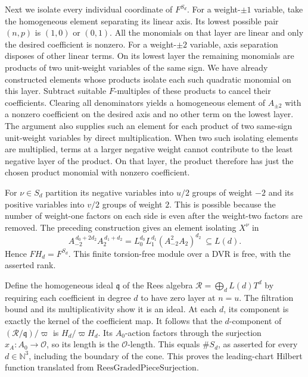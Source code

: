 Next we isolate every individual coordinate of \(F^{S_d}\). For a
weight-\(\pm1\) variable, take the homogeneous element separating
its linear axis. Its lowest possible pair \((n,p)\) is \((1,0)\)
or \((0,1)\). All the monomials on that layer are linear and only
the desired coefficient is nonzero. For a weight-\(\pm2\) variable,
axis separation disposes of other linear terms. On its lowest
layer the remaining monomials are products of two unit-weight
variables of the same sign. We have already constructed elements
whose products isolate each such quadratic monomial on this layer.
Subtract suitable \(F\)-multiples of these products to cancel their
coefficients. Clearing all denominators yields a homogeneous element
of \(A_{\pm2}\) with a nonzero coefficient on the desired axis and
no other term on the lowest layer. The argument also supplies such
an element for each product of two same-sign unit-weight variables
by direct multiplication. When two such isolating elements are
multiplied, terms at a larger negative weight cannot contribute to
the least negative layer of the product. On that layer, the product
therefore has just the chosen product monomial with nonzero coefficient.

For \(\nu\in S_d\) partition its negative variables into
\(u/2\) groups of weight \(-2\) and its positive variables into
\(v/2\) groups of weight \(2\). This is possible because the
number of weight-one factors on each side is even after the
weight-two factors are removed. The preceding construction gives
an element isolating \(X^\nu\) in
\[
 A_{-2}^{\,d_0+2d_2}A_2^{\,d_1+d_2}
    = L_0^{d_0}L_1^{d_1}(A_{-2}^2A_2)^{d_2}
    \ \subseteq L(d).
\]
Hence \(F H_d=F^{S_d}\). This finite torsion-free module over a DVR
is free, with the asserted rank.

Define the homogeneous ideal \(\mathfrak q\) of the Rees algebra
\(\mathcal R=\bigoplus_d L(d)T^d\) by requiring each coefficient in
degree \(d\) to have zero layer at \(n=u\). The filtration bound
and its multiplicativity show it is an ideal. At each \(d\), its
component is exactly the kernel of the coefficient map. It follows
that the \(d\)-component of \((\mathcal R/\mathfrak q)/\varpi\)
is \(H_d/\varpi H_d\). Its \(A_0\)-action factors through the
surjection \(x_A:A_0\to\mathcal O\), so its length is
the \(\mathcal O\)-length. This equals \(\#S_d\), as asserted for
every \(d\in\mathbb N^3\), including the boundary of the cone.
This proves the leading-chart Hilbert function translated from
\(\mathrm{ReesGradedPieceSurjection}\).

